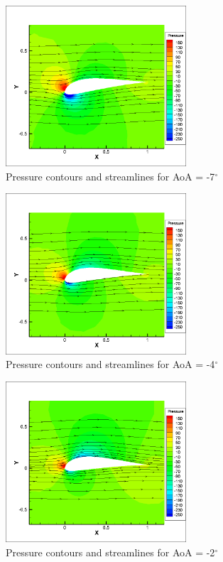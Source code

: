 \begin{figure}[H]
	\centering
	\includegraphics[width=0.6\textwidth]{tecplot_stuff/cont_stream_-7.png}
	\caption{Pressure contours and streamlines for AoA = -7$^\circ$}
\label{fig:cont_stream_-7}
\end{figure}

\begin{figure}[H]
	\centering
	\includegraphics[width=0.6\textwidth]{tecplot_stuff/cont_stream_-4.png}
	\caption{Pressure contours and streamlines for AoA = -4$^\circ$}
\label{fig:cont_stream_-4}
\end{figure}


\begin{figure}[H]
	\centering
	\includegraphics[width=0.6\textwidth]{tecplot_stuff/cont_stream_-2.png}
	\caption{Pressure contours and streamlines for AoA = -2$^\circ$}
\label{fig:cont_stream_-2}
\end{figure}


